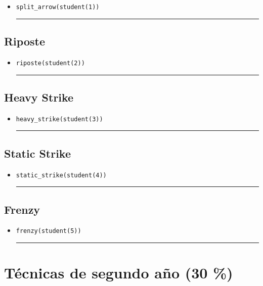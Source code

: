 \documentclass[11pt]{article}
\newcommand{\matlab}[1]{\lstinline[style=Matlab-editor]!#1!}
\newcommand{\shortresponserule}{{\large\rule{5 cm}{0.3mm}}}
\begin{document}


\begin{itemize}
    \item \matlab{split_arrow(student(1))} \hfill \shortresponserule
\end{itemize}

\subsection{Riposte}



\begin{itemize}
    \item \matlab{riposte(student(2))} \hfill \shortresponserule
\end{itemize}

\subsection{Heavy Strike}


\begin{itemize}
    \item \matlab{heavy_strike(student(3))} \hfill \shortresponserule
\end{itemize}

\subsection{Static Strike}


\begin{itemize}
    \item \matlab{static_strike(student(4))} \hfill \shortresponserule
\end{itemize}

\subsection{Frenzy}


\begin{itemize}
    \item \matlab{frenzy(student(5))} \hfill \shortresponserule
\end{itemize}

\pagebreak

\section{Técnicas de segundo año (30 \%)}
\end{document}
